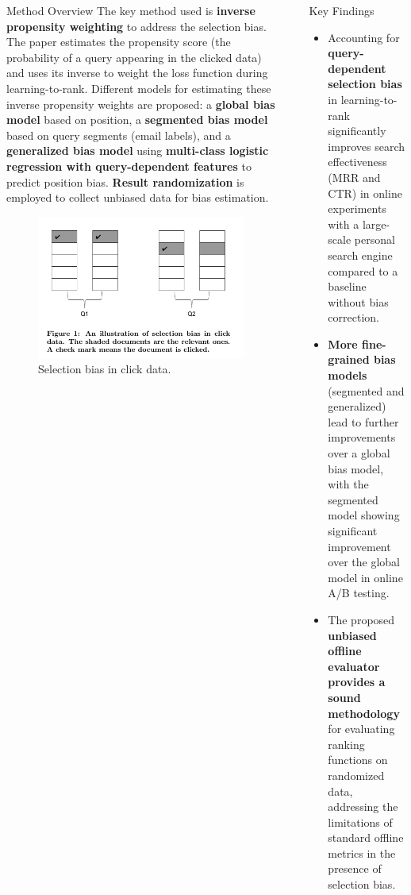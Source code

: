 \documentclass[final]{beamer}
\newlength{\sepwidth}
\newlength{\colwidth}
\newcommand{\separatorcolumn}{\begin{column}{\sepwidth}\end{column}}
\begin{document}
\begin{frame}[t]
\begin{columns}[t]
\begin{column}{\colwidth}
  \begin{block}{Method Overview}
	The key method used is \textbf{inverse propensity weighting} to address the selection bias. The paper estimates the propensity score (the probability of a query appearing in the clicked data) and uses its inverse to weight the loss function during learning-to-rank. Different models for estimating these inverse propensity weights are proposed: a \textbf{global bias model} based on position, a \textbf{segmented bias model} based on query segments (email labels), and a \textbf{generalized bias model} using \textbf{multi-class logistic regression with query-dependent features} to predict position bias. \textbf{Result randomization} is employed to collect unbiased data for bias estimation.
    \begin{figure}
      \centering
      \includegraphics[width=0.9\linewidth]{fig 1.png}
      \caption{Selection bias in click
      	data.}
    \end{figure}
  \end{block}
\end{column}

\separatorcolumn

\begin{column}{\colwidth}

  \begin{block}{Key Findings}
    \begin{itemize}
      \item Accounting for \textbf{query-dependent selection bias} in learning-to-rank significantly improves search effectiveness (MRR and CTR) in online experiments with a large-scale personal search engine compared to a baseline without bias correction.
      \item \textbf{More fine-grained bias models} (segmented and generalized) lead to further improvements over a global bias model, with the segmented model showing significant improvement over the global model in online A/B testing.
      \item The proposed \textbf{unbiased offline evaluator provides a sound methodology} for evaluating ranking functions on randomized data, addressing the limitations of standard offline metrics in the presence of selection bias.
    \end{itemize}
  \end{block}


\end{column}
\end{columns}
\end{frame}
\end{document}
